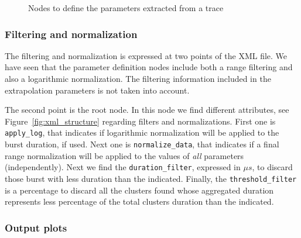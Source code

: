 \documentclass[a4paper, 12pt]{article}
\begin{document}
\begin{figure}
  \centering
  
  
  
  \caption{Nodes to define the parameters extracted from a trace}
  \label{fig:xml_events_definition}

\end{figure}

\subsubsection{Filtering and normalization}

The filtering and normalization is expressed at two points of the XML file.
We have seen that the parameter definition nodes include both a range 
filtering and also a logarithmic normalization. The filtering information
included in the extrapolation parameters is not taken into account.

The second point is the root node. In this node we find different attributes,
see Figure~\ref{fig:xml_structure} regarding filters and normalizations.
First one is \texttt{apply\_log}, that indicates if logarithmic normalization
will be applied to the burst duration, if used. Next one is \texttt{normalize\_data},
that indicates if a final range normalization will be applied to the values 
of \textit{all} parameters (independently). Next we find the
\texttt{duration\_filter}, expressed in $\mu s$, to discard those burst with
less duration than the indicated. Finally, the \texttt{threshold\_filter}
is a percentage to discard all the clusters found whose aggregated duration 
represents less percentage of the total clusters duration than the indicated.

\subsubsection{Output plots}
\end{document}
